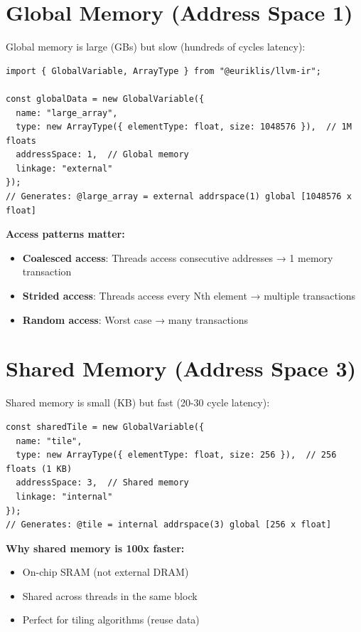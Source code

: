 \documentclass[11pt,oneside]{book}
\begin{document}
\section{Global Memory (Address Space 1)}

Global memory is large (GBs) but slow (hundreds of cycles latency):

\begin{lstlisting}[style=ts]
import { GlobalVariable, ArrayType } from "@euriklis/llvm-ir";

const globalData = new GlobalVariable({
  name: "large_array",
  type: new ArrayType({ elementType: float, size: 1048576 }),  // 1M floats
  addressSpace: 1,  // Global memory
  linkage: "external"
});
// Generates: @large_array = external addrspace(1) global [1048576 x float]
\end{lstlisting}

\textbf{Access patterns matter:}
\begin{itemize}[noitemsep]
  \item \textbf{Coalesced access}: Threads access consecutive addresses → 1 memory transaction
  \item \textbf{Strided access}: Threads access every Nth element → multiple transactions
  \item \textbf{Random access}: Worst case → many transactions
\end{itemize}

\section{Shared Memory (Address Space 3)}

Shared memory is small (KB) but fast (20-30 cycle latency):

\begin{lstlisting}[style=ts]
const sharedTile = new GlobalVariable({
  name: "tile",
  type: new ArrayType({ elementType: float, size: 256 }),  // 256 floats (1 KB)
  addressSpace: 3,  // Shared memory
  linkage: "internal"
});
// Generates: @tile = internal addrspace(3) global [256 x float]
\end{lstlisting}

\textbf{Why shared memory is 100x faster:}
\begin{itemize}[noitemsep]
  \item On-chip SRAM (not external DRAM)
  \item Shared across threads in the same block
  \item Perfect for tiling algorithms (reuse data)
\end{itemize}
\end{document}

